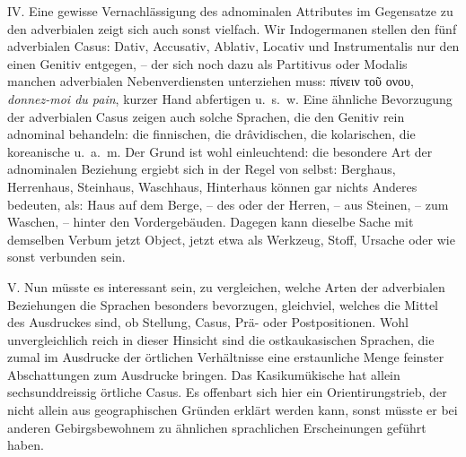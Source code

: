 IV. Eine gewisse Vernachlässigung des adnominalen Attributes im Gegensatze zu den adverbialen zeigt sich auch sonst vielfach. Wir Indogermanen stellen den fünf adverbialen Casus: Dativ, Accusativ, Ablativ, Locativ und Instrumentalis nur den einen Genitiv entgegen, – der sich noch dazu als Partitivus oder Modalis manchen adverbialen Nebenverdiensten unterziehen muss: πίνειν τοῦ ονου, \textit{donnez-moi du pain}, kurzer Hand abfertigen u.~s.~w. Eine ähnliche Bevorzugung der adverbialen Casus zeigen auch solche Sprachen, die den Genitiv rein adnominal behandeln: die finnischen, die drâvidischen, die kolarischen, die koreanische u.~a.~m. Der Grund ist wohl einleuchtend: die besondere Art der adnominalen Beziehung ergiebt sich in der Regel von selbst: Berghaus, Herrenhaus, Steinhaus, Waschhaus, Hinterhaus können gar nichts Anderes bedeuten, als: Haus auf dem Berge, – des oder der Herren, – aus Steinen, – zum Waschen, – hinter den Vordergebäuden. Dagegen kann dieselbe Sache mit demselben Verbum jetzt  Object, jetzt etwa als Werkzeug, Stoff, Ursache oder wie sonst verbunden sein.

V. Nun müsste es interessant sein, zu vergleichen, welche Arten der adverbialen Beziehungen die Sprachen besonders bevorzugen, gleichviel, welches die Mittel des Ausdruckes sind, ob Stellung, Casus, Prä- oder Postpositionen. Wohl unvergleichlich reich in dieser Hinsicht sind die ostkaukasischen Sprachen, die zumal im Ausdrucke der örtlichen Verhältnisse eine erstaunliche Menge feinster Abschattungen zum Ausdrucke bringen. Das Kasikumükische hat allein sechsunddreissig örtliche Casus. Es offenbart sich hier ein Orientirungstrieb, \label{sp.463} der nicht allein aus geographischen Gründen erklärt werden kann, sonst müsste er bei anderen Gebirgsbewohnem zu ähnlichen sprachlichen Erscheinungen geführt haben.

